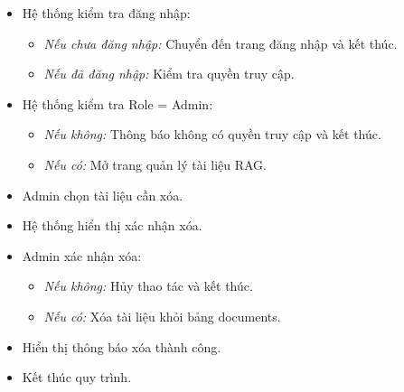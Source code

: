 \begin{itemize}
    \item Hệ thống kiểm tra đăng nhập:
    \begin{itemize}
        \item  \textit{Nếu chưa đăng nhập:} Chuyển đến trang đăng nhập và kết thúc.
        \item  \textit{Nếu đã đăng nhập:} Kiểm tra quyền truy cập.
    \end{itemize}
    
    \item Hệ thống kiểm tra Role = Admin:
    \begin{itemize}
        \item  \textit{Nếu không:} Thông báo không có quyền truy cập và kết thúc.
        \item  \textit{Nếu có:} Mở trang quản lý tài liệu RAG.
    \end{itemize}
    
    \item Admin chọn tài liệu cần xóa.
    
    \item Hệ thống hiển thị xác nhận xóa.
    
    \item Admin xác nhận xóa:
    \begin{itemize}
        \item  \textit{Nếu không:} Hủy thao tác và kết thúc.
        \item  \textit{Nếu có:} Xóa tài liệu khỏi bảng documents.
    \end{itemize}
    
    \item Hiển thị thông báo xóa thành công.
    
    \item Kết thúc quy trình.
\end{itemize}
